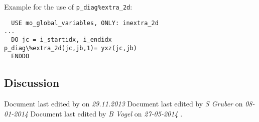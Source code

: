 Example for the use of  \texttt{p\_diag\%extra\_2d}:  

\begin{small}
\begin{verbatim}
  USE mo_global_variables, ONLY: inextra_2d
...
  DO jc = i_startidx, i_endidx
p_diag\%extra_2d(jc,jb,1)= yxz(jc,jb)
  ENDDO
\end{verbatim}
\end{small}



\newpage
\subsection*{Discussion}
Document last edited by \textit{\krauti} on \textit{29.11.2013}
Document last edited by \textit{S Gruber} on \textit{08-01-2014}
Document last edited by \textit{B Vogel} on \textit{27-05-2014}
.




